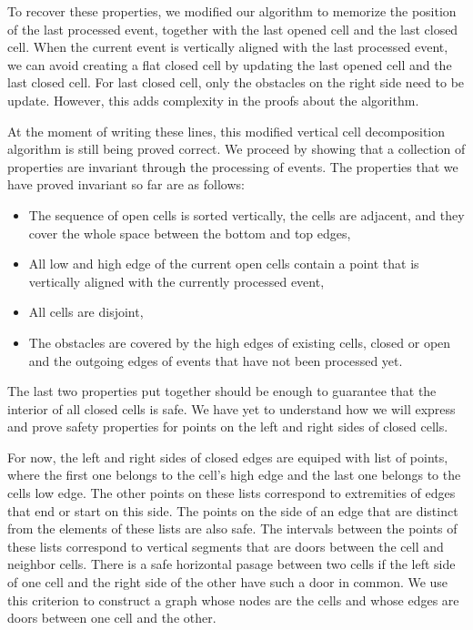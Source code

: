 \documentclass{easychair}
\begin{document}
To recover these properties, we modified our algorithm to memorize the
position of the last processed event, together with the last opened
cell and the last closed cell.  When the current event is vertically
aligned with the last processed event, we can avoid creating a flat
closed cell by updating the last opened cell and the last closed
cell.  For last closed cell, only the obstacles on the right side need
to be update.  However, this adds complexity in the proofs about the
algorithm.

At the moment of writing these lines, this modified vertical cell
decomposition algorithm is still being proved correct.  We proceed by
showing that a collection of properties are invariant through the
processing of events.  The properties that we have proved invariant so
far are as follows:
\begin{itemize}
\item The sequence of open cells is sorted vertically, the cells are
  adjacent, and they cover the whole space between the bottom and top
  edges,
\item All low and high edge of the current open cells contain a point
that is vertically aligned with the currently processed event,
\item All cells are disjoint,
\item The obstacles are covered by the high edges of existing cells,
  closed or open and the outgoing edges of events that have not been
  processed yet.
\end{itemize}
The last two properties put together should be enough to guarantee
that the interior of all closed cells is safe.  We have yet to
understand how we will express and prove safety properties for points
on the left and right sides of closed cells.

For now, the left and right sides of closed edges are equiped with
list of points, where the first one belongs to the cell's high edge
and the last one belongs to the cells low edge.  The other points on
these lists correspond to extremities of edges that end or start on
this side.  The points on the side of an edge that are distinct from
the elements of these lists are also safe.  The intervals between the
points of these lists correspond to vertical segments that are doors
between the cell and neighbor cells.  There is a safe horizontal
pasage between two cells if the left side of one cell and the right
side of the other have such a door in common.  We use this criterion
to construct a graph whose nodes are the cells and whose edges are
doors between one cell and the other.
\end{document}
